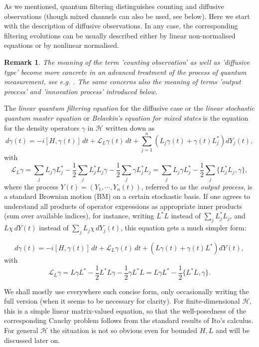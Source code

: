 \documentclass[12pt]{article}
\def\LC{\mathcal{L}}
\def\HC{\mathcal{H}}
\def\ga{\gamma}
\newtheorem{remark}{Remark}
\begin{document}
As we mentioned, quantum filtering distinguishes counting and diffusive observations
(though mixed channels can also be used, see below). Here we start with the description
of diffusive observations. In any case, the corresponding filtering evolutions can be usually
described either by linear non-normalised equations or by nonlinear normalised.

\begin{remark} The meaning of the term 'counting observation' as well as 'diffusive type'
become more concrete in an advanced
treatment of the process of quantum measurement, see e.g.  \cite{BoutHanJamQuantFilt}.
The same concerns also the meaning of terms 'output process' and 'innovation process' introduced below.
\end{remark}

The {\it linear quantum filtering equation} for the diffusive case
or the {\it linear stochastic quantum master equation} or {\it Belavkin's equation for mixed states}
is the equation for the density operators $\ga$ in $\HC$
written down as
\begin{equation}
\label{Lindstoch0}
d\ga(t)=-i[H,\ga(t)] \, dt +\LC_L \ga(t) \, dt +\sum_{j=1}^n (L_j\ga(t)+\ga(t) L^*_j) dY_j(t),
\end{equation}
with
\[
\LC_L\ga =\sum_j L_j\ga L^*_j-\frac12 \sum_j L^*_jL_j\ga -\frac12 \sum_j \ga L^*_jL_j
=\sum_j L_j\ga L^*_j-\frac12 \sum_j \{L^*_jL_j,\ga\},
\]
where the process $Y(t)=(Y_1, \cdots, Y_n(t))$, referred to as the {\it output process},
 is a standard Brownian motion (BM) on a certain stochastic basis. If one agrees
 to understand all products of operator expressions as appropriate inner products
(sum over available indices), for instance, writing $L^*L$ instead of $\sum_j L_j^* L_j$,
and $L \chi \, dY(t)$ instead of $\sum_j L_j\chi \, dY_j(t)$,
 this equation gets a much simpler form:

\begin{equation}
\label{Lindstoch}
d\ga(t)=-i[H,\ga(t)] \, dt +\LC_L \ga(t) \, dt +(L\ga(t)+\ga(t) L^*) dY(t),
\end{equation}
with
\[
\LC_L\ga =L\ga L^*-\frac12 L^*L\ga -\frac12 \ga L^*L
=L\ga L^*-\frac12 \{L^*L,\ga\}.
\]

We shall mostly use everywhere such concise form, only occasionally writing the full version
(when it seems to be necessary for clarity).
For finite-dimensional $\HC$, this is a simple linear matrix-valued equation, so that
the well-posedness of the corresponding Cauchy problem follows from the standard results of Ito's calculus.
For general $\HC$ the situation is not so obvious even for bounded $H,L$ and will be discussed later on.
\end{document}

